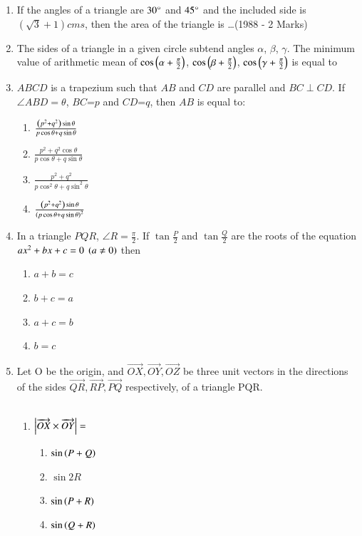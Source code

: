 \begin{enumerate}[label=\thesubsection.\arabic*,ref=\thesubsection.\theenumi]
\begin{enumerate}
    \item If the angles of a triangle are $30\degree$ and $45\degree$ and the included side is $(\sqrt{3} + 1) cms$, then the area of the triangle is \dots \hfill (1988 - 2 Marks)
    \item The sides of a triangle in a given circle subtend angles $\alpha$, $\beta$, $\gamma$. The minimum value of arithmetic mean of $\cos \left(\alpha + \frac{\pi}{2}\right)$, $\cos \left(\beta + \frac{\pi}{2}\right)$, $\cos \left(\gamma + \frac{\pi}{2}\right)$ is equal to 
        \hfill{}
\item $ABCD$ is a trapezium such that $AB$ and $CD$ are parallel and $BC\perp CD$. If $\angle ABD=\theta$, $BC$=$p$ and $CD$=$q$, then $AB$ is equal to:
\hfill{}
\begin{multicols}{2} 
\begin{enumerate}
\item $\frac{\left(p^2+q^2\right)\sin\theta}{p\cos\theta+q\sin\theta}$
\item $\frac{p^2+q^2\cos\theta}{p\cos\theta+q\sin\theta}$
\columnbreak
\item $\frac{p^2+q^2}{p\cos^2 \theta+q\sin^2 \theta}$
\item $\frac{\left(p^2+q^2\right)\sin\theta}{\left(p\cos\theta+q\sin\theta\right)^2}$
\end{enumerate}
\end{multicols}
\item In a triangle $PQR$, $\angle R = \frac{\pi}{2}$. If $\tan{\frac{P}{2}}$ and $\tan{\frac{Q}{2}}$ are the roots of the equation $ax^2+bx+c=0 \;\left(a\neq0\right)$ then
        
        \hfill{}
        \begin{enumerate}
                \item $a+b=c$
                \item $b+c=a$
                \item $a+c=b$ 
                \item $b=c$
        \end{enumerate}
\item
Let O be the origin, and $\overrightarrow{OX},\overrightarrow{OY},\overrightarrow{OZ}$ be three unit vectors in the directions of the sides $\overrightarrow{QR},\overrightarrow{RP},\overrightarrow{PQ}$ respectively, of a triangle PQR.\hfill{}\\\\
\begin{enumerate}
	\item $\left\vert\overrightarrow{OX}\times\overrightarrow{OY}\right\vert=$
	\begin{enumerate}[label=(\alph*)]
		\item$\sin\left(P+Q\right)$ 
		\item$\sin2R$
		\item$\sin\left(P+R\right)$
		\item$\sin\left(Q+R\right)$
	\end{enumerate}


\end{enumerate}
\end{enumerate}
\end{enumerate}
